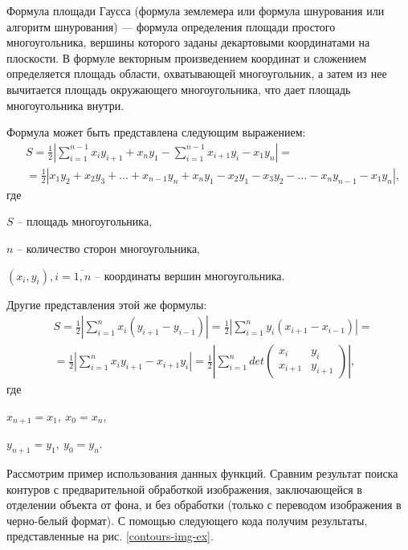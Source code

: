 Формула площади Гаусса (формула землемера или формула шнурования или
алгоритм шнурования) — формула определения площади простого
многоугольника, вершины которого заданы декартовыми координатами на
плоскости. В формуле векторным произведением координат и сложением
определяется площадь области, охватывающей многоугольник, а затем из
нее вычитается площадь окружающего многоугольника, что дает площадь
многоугольника внутри. 

Формула может быть представлена следующим выражением:
\begin{equation}
\begin{aligned}
	&S = \frac{1}{2} \left| 
	\sum_{i=1}^{n-1}{x_i y_{i+1}}+x_n y_1 -
	\sum_{i=1}^{n-1}{x_{i+1} y_i} - x_1 y_n
	\right|=\\
	&=\frac{1}{2} \left| x_1 y_2 + x_2 y_3 + 
	\dots + x_{n-1} y_n + x_n y_1 - x_2 y_1
	-x_3 y_2 - \dots - x_n y_{n-1} - x_1 y_n\right|,
\end{aligned}
\label{gauss-square-equation}
\end{equation}
где

$S$ -- площадь многоугольника,

$n$ -- количество сторон многоугольника,

$(x_i, y_i), i=\overline{1,n}$ -- координаты вершин многоугольника.

Другие представления этой же формулы:
\begin{equation}
\begin{aligned}
	&S = \frac{1}{2} \left| 
	\sum_{i=1}^n{x_i (y_{i+1}-y_{i-1})} \right| =
	\frac{1}{2} \left| 
	\sum_{i=1}^n{y_i (x_{i+1}-x_{i-1})} \right| =\\
	&= \frac{1}{2} \left| 
	\sum_{i=1}^n{x_i y_{i+1} - x_{i+1} y_i} \right| =
	\frac{1}{2} \left| 
	\sum_{i=1}^n{det
	\begin{pmatrix}
		x_i & y_i \\
		x_{i+1} & y_{i+1}
	\end{pmatrix}
	} \right|,
\end{aligned}
\label{gauss-square-equation-1}
\end{equation}
где

$x_{n+1}=x_1,~x_0=x_n$,

$y_{n+1}=y_1,~y_0=y_n$.

\bigskip

Рассмотрим пример использования данных функций. Сравним результат
поиска контуров с предварительной обработкой изображения, 
заключающейся в отделении объекта от фона, и без обработки (только с 
переводом изображения в черно-белый формат). С помощью следующего
кода получим результаты, представленные на рис. \ref{contours-img-ex}.

